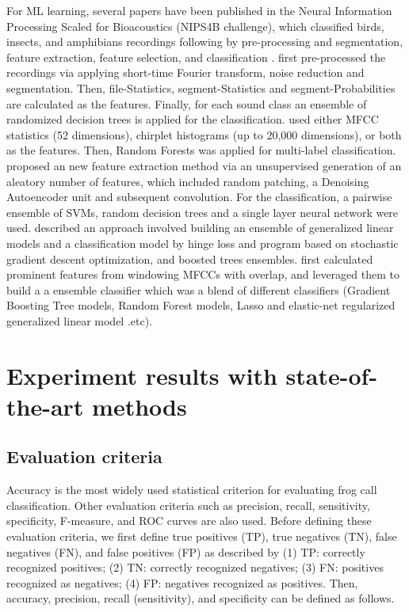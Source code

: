 For ML learning, several papers have been published in the Neural Information Processing Scaled for Bioacoustics (NIPS4B challenge), which classified birds, insects, and amphibians recordings following by pre-processing and segmentation, feature extraction, feature selection, and classification \citep{lasseck2013bird, stowell2013feature, mencia2013learning, massaronensemble, chen2013novel}. \citep{lasseck2013bird} first pre-processed the recordings via applying short-time Fourier transform, noise reduction and segmentation. Then, file-Statistics, segment-Statistics and segment-Probabilities are calculated as the features. Finally, for each sound class an ensemble of
randomized decision trees is applied for the classification. \citep{stowell2013feature} used either MFCC statistics (52 dimensions), chirplet histograms (up
to 20,000 dimensions), or both as the features. Then, Random Forests was applied for multi-label classification. \citep{mencia2013learning} proposed an new feature extraction method via an unsupervised generation of an aleatory number of features, which included random patching, a Denoising Autoencoder unit and subsequent convolution. For the classification, a pairwise ensemble of SVMs, random decision trees and a single layer
neural network were used. 
\citep{massaronensemble} described an approach involved building an ensemble of generalized linear models and a classification model by hinge loss and program based on stochastic gradient descent optimization, and boosted trees ensembles. 
\citep{chen2013novel} first calculated prominent features from windowing MFCCs with overlap, and leveraged them to build a a ensemble classifier which was a blend of different classifiers (Gradient Boosting Tree models, Random Forest models, Lasso and elastic-net regularized generalized linear model .etc).




\section{Experiment results with state-of-the-art methods}
\label{experiment}


\subsection{Evaluation criteria}

Accuracy is the most widely used statistical criterion for evaluating frog call classification. Other evaluation criteria such as precision, recall, sensitivity, specificity, F-measure, and ROC curves are also used. Before defining these evaluation criteria, we first define true positives (TP), true negatives (TN), false negatives (FN), and false positives (FP) as described by  \citep{gordon2003sequence} 
(1) TP: correctly recognized positives;
(2) TN: correctly recognized negatives;
(3) FN: positives recognized as negatives;
(4) FP: negatives recognized as positives.
Then, accuracy, precision, recall (sensitivity), and specificity can be defined as follows.

